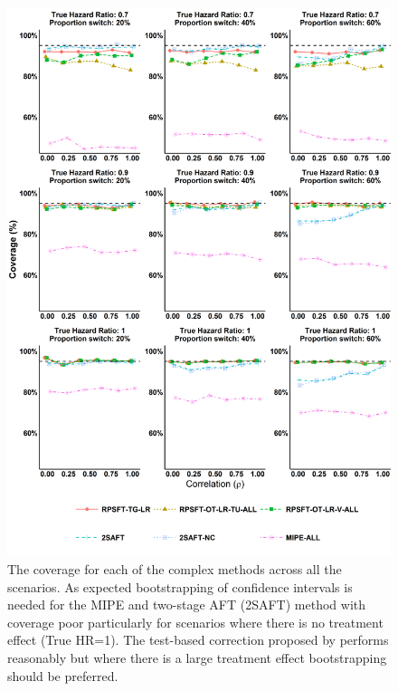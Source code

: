 \begin{figure}[ht]
\centering
\includegraphics[width=13cm]{images/chap_sim2/complex_cov.png}
\caption{\label{F:chap_sim2:comp_cov} The coverage for each of the complex methods across all the scenarios. As expected bootstrapping of confidence intervals is needed for the MIPE and two-stage AFT (2SAFT) method with coverage poor particularly for scenarios where there is no treatment effect (True HR=1). The test-based correction proposed by \cite{White1999} performs reasonably but where there is a large treatment effect bootstrapping should be preferred.} 
\end{figure}

\clearpage 

